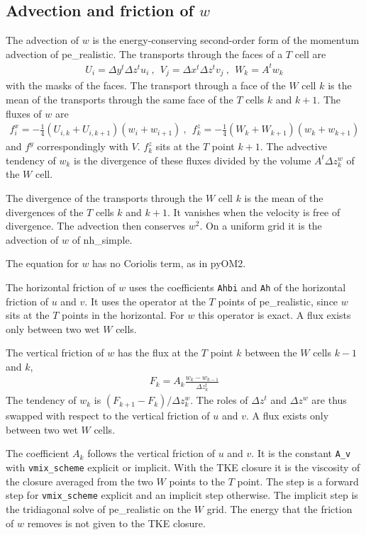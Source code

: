 \documentclass[12pt]{article}
\newcommand{\beq}  { \begin{eqnarray} }
\newcommand{\eeq}  { \end{eqnarray}}
\newcommand{\lk}{\left(}
\newcommand{\rk}{\right)}
\begin{document}
\subsection*{Advection and friction of $w$}

The advection of $w$ is the energy-conserving second-order form of the momentum advection of pe\_realistic.
The transports through the faces of a $T$ cell are
\beq
 U_i = \Delta y^t \Delta z^t u_i ~,~~
 V_j = \Delta x^t \Delta z^t v_j ~,~~
 W_k = A^t w_k
\eeq
with the masks of the faces.
The transport through a face of the $W$ cell $k$ is the mean of the transports through the same face of the $T$ cells $k$ and $k+1$.
The fluxes of $w$ are
\beq
 f^x_i = - \frac{1}{4} \lk U_{i,k} + U_{i,k+1} \rk \lk w_i + w_{i+1} \rk ~,~~
 f^z_k = - \frac{1}{4} \lk W_k + W_{k+1} \rk \lk w_k + w_{k+1} \rk
\eeq
and $f^y$ correspondingly with $V$.
$f^z_k$ sits at the $T$ point $k+1$.
The advective tendency of $w_k$ is the divergence of these fluxes divided by the volume $A^t \Delta z^w_k$ of the $W$ cell.

The divergence of the transports through the $W$ cell $k$ is the mean of the divergences of the $T$ cells $k$ and $k+1$.
It vanishes when the velocity is free of divergence.
The advection then conserves $w^2$.
On a uniform grid it is the advection of $w$ of nh\_simple.

The equation for $w$ has no Coriolis term, as in pyOM2.

The horizontal friction of $w$ uses the coefficients \verb|Ahbi| and \verb|Ah| of the horizontal friction of $u$ and $v$.
It uses the operator at the $T$ points of pe\_realistic, since $w$ sits at the $T$ points in the horizontal.
For $w$ this operator is exact.
A flux exists only between two wet $W$ cells.

The vertical friction of $w$ has the flux at the $T$ point $k$ between the $W$ cells $k-1$ and $k$,
\beq
 F_k = A_k \frac{w_k - w_{k-1}}{\Delta z^t_k}
\eeq
The tendency of $w_k$ is $(F_{k+1} - F_k)/\Delta z^w_k$.
The roles of $\Delta z^t$ and $\Delta z^w$ are thus swapped with respect to the vertical friction of $u$ and $v$.
A flux exists only between two wet $W$ cells.

The coefficient $A_k$ follows the vertical friction of $u$ and $v$.
It is the constant \verb|A_v| with \verb|vmix_scheme| explicit or implicit.
With the TKE closure it is the viscosity of the closure averaged from the two $W$ points to the $T$ point.
The step is a forward step for \verb|vmix_scheme| explicit and an implicit step otherwise.
The implicit step is the tridiagonal solve of pe\_realistic on the $W$ grid.
The energy that the friction of $w$ removes is not given to the TKE closure.
\end{document}
